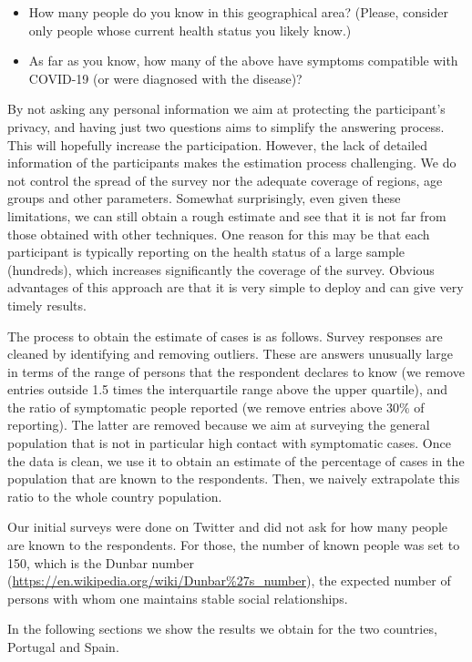 \documentclass{article}
\begin{document}
\begin{itemize}
\item How many people do you know in this geographical area? (Please, consider only people whose current health status you likely know.)
\item As far as you know, how many of the above have symptoms compatible with COVID-19 (or were diagnosed with the disease)?
\end{itemize}

By not asking any personal information we aim at protecting the participant's privacy, and having just two questions aims to simplify the answering process. This will hopefully increase the participation. However, the lack of detailed information of the participants makes the estimation process challenging. We do not control the spread of the survey nor the adequate coverage of regions, age groups and other parameters. Somewhat surprisingly, even given these limitations, we can still obtain a rough estimate and see that it is not far from those obtained with other techniques. One reason for this may be that each participant is typically reporting on the health status of a large sample (hundreds), which increases significantly the coverage of the survey. Obvious advantages of this approach are that it is very simple to deploy and can give very timely results.

The process to obtain the estimate of cases is as follows.
Survey responses are cleaned by identifying and removing outliers. These are answers unusually large in terms of the range of persons that the respondent declares to know (we remove entries outside 1.5 times the interquartile range above the upper quartile), and the ratio of symptomatic people reported (we remove entries above $30\%$ of reporting). The latter are removed because we aim at surveying the general population that is not in particular high contact with symptomatic cases. Once the data is clean, we use it to obtain an estimate of the percentage of cases in the population that are known to the respondents. Then, we naively extrapolate this ratio to the whole country population.

Our initial surveys were done on Twitter and did not ask for how many people are known to the respondents. For those, the number of known people was set to 150, which is the Dunbar number (\url{https://en.wikipedia.org/wiki/Dunbar%27s_number}), the expected number of persons with whom one maintains stable social relationships. 

In the following sections we show the results we obtain for the two countries, Portugal and Spain. 
\end{document}
